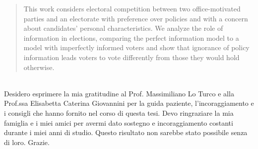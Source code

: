 \documentclass[11pt,a4paper]{article}
\begin{document}
\newpage
\null{} %
\begin{abstract}

\noindent
{\color{red} %
This work considers electoral competition between two office-motivated parties and an electorate with preference over policies and with a concern about candidates' personal characteristics. We analyze the role of information in elections, comparing the perfect information model to a model with imperfectly informed voters and show that ignorance of policy information leads voters to vote differently from those they would hold otherwise.}
\null %
\end{abstract}

\newpage
{}
\null{}
\\
\textnormal{Desidero esprimere la mia gratitudine al Prof. Massimiliano Lo Turco e alla Prof.ssa Elisabetta Caterina Giovannini per la guida paziente, l’incoraggiamento e i consigli che hanno fornito nel corso di questa tesi. Devo ringraziare la mia famiglia e i miei amici per avermi dato sostegno e incoraggiamento costanti durante i miei anni di studio. Questo risultato non sarebbe stato possibile senza di loro. Grazie.}
\null

\newpage
\begin{flushleft}
\tableofcontents
\end{flushleft}

\newpage
\listoffigures

\end{document}
